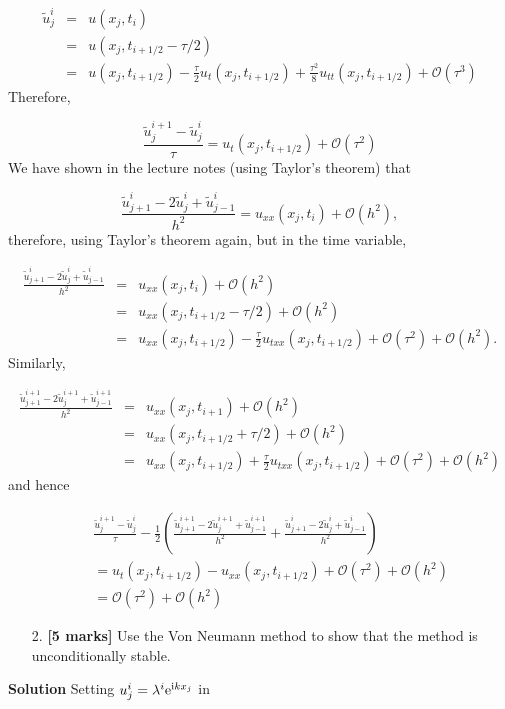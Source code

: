 \documentclass[12pt,a4paper]{article}
\begin{document}
\begin{eqnarray*}
\tilde{u}^{i}_j  &=& u(x_{j},t_{i})\\
                 &=& u(x_j,t_{i+1/2}-\tau/2) \\
                 &=& u(x_j,t_{i+1/2}) - \frac{\tau}{2}u_t(x_j,t_{i+1/2}) + \frac{\tau^2}{8}u_{tt}(x_j,t_{i+1/2}) + \mathcal{O}(\tau^3)
\end{eqnarray*}
Therefore,

\[
\frac{\tilde{u}^{i+1}_j - \tilde{u}^i_j}{\tau} = u_t(x_j,t_{i+1/2}) + \mathcal{O}(\tau^2)
\]
We have shown in the lecture notes (using Taylor's theorem) that

\[
\frac{\tilde{u}^{i}_{j+1} - 2\tilde{u}^{i}_{j} + \tilde{u}^{i}_{j-1}}{h^2} = u_{xx}(x_j,t_i) + \mathcal{O}(h^2),
\]
therefore, using Taylor's theorem again, but in the time variable,


\begin{eqnarray*}
\frac{\tilde{u}^{i}_{j+1} - 2\tilde{u}^{i}_{j} + \tilde{u}^{i}_{j-1}}{h^2} &=& u_{xx}(x_j,t_i) + \mathcal{O}(h^2)  \\
&=&  u_{xx}(x_j,t_{i+1/2}-\tau/2) + \mathcal{O}(h^2) \\
&=&  u_{xx}(x_j,t_{i+1/2}) - \frac{\tau}{2}u_{txx}(x_j,t_{i+1/2}) +  \mathcal{O}(\tau^2) + \mathcal{O}(h^2).
\end{eqnarray*}
Similarly,


\begin{eqnarray*}
\frac{\tilde{u}^{i+1}_{j+1} - 2\tilde{u}^{i+1}_{j} + \tilde{u}^{i+1}_{j-1}}{h^2} &=& u_{xx}(x_j,t_{i+1}) + \mathcal{O}(h^2)  \\
&=&  u_{xx}(x_j,t_{i+1/2}+\tau/2) + \mathcal{O}(h^2) \\
&=&  u_{xx}(x_j,t_{i+1/2}) + \frac{\tau}{2}u_{txx}(x_j,t_{i+1/2}) +  \mathcal{O}(\tau^2) + \mathcal{O}(h^2)
\end{eqnarray*}
and hence


\begin{eqnarray*}
&& \frac{\tilde{u}^{i+1}_j - \tilde{u}^i_j}{\tau} - \frac{1}{2}\left( \frac{\tilde{u}^{i+1}_{j+1} - 2\tilde{u}^{i+1}_{j} + \tilde{u}^{i+1}_{j-1}}{h^2} + \frac{\tilde{u}^{i}_{j+1} - 2\tilde{u}^{i}_{j} + \tilde{u}^{i}_{j-1}}{h^2}   \right) \\
&& =  u_t(x_j,t_{i+1/2}) - u_{xx}(x_j,t_{i+1/2})  +  \mathcal{O}(\tau^2) + \mathcal{O}(h^2) \\
&& = \mathcal{O}(\tau^2) + \mathcal{O}(h^2)
\end{eqnarray*}
\begin{itemize}
\item[2. ] \textbf{[5 marks]} Use the Von Neumann method to show that the method is unconditionally stable.

\end{itemize}
\textbf{Solution} Setting $u^{i}_j = \lambda^i {\rm e}^{{\rm i}kx_j}$ in
\end{document}
